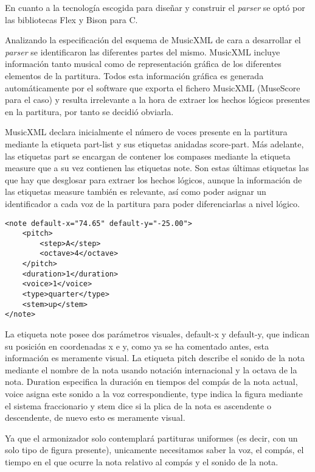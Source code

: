 En cuanto a la tecnología escogida para diseñar y construir el \textit{parser} se optó por las bibliotecas Flex y Bison para C.

Analizando la especificación del esquema de MusicXML de cara a desarrollar el \textit{parser} se identificaron las diferentes partes del mismo. MusicXML incluye información tanto musical como de representación gráfica de los diferentes elementos de la partitura. Todos esta información gráfica es generada automáticamente por el software que exporta el fichero MusicXML (MuseScore para el caso) y resulta irrelevante a la hora de extraer los hechos lógicos presentes en la partitura, por tanto se decidió obviarla. 

MusicXML declara inicialmente el número de voces presente en la partitura mediante la etiqueta part-list y sus etiquetas anidadas score-part. Más adelante, las etiquetas part se encargan de contener los compases mediante la etiqueta measure que a su vez contienen las etiquetas note. Son estas últimas etiquetas las que hay que desglosar para extraer los hechos lógicos, aunque la información de las etiquetas measure también es relevante, así como poder asignar un identificador a cada voz de la partitura para poder diferenciarlas a nivel lógico.

\begin{verbatim}
<note default-x="74.65" default-y="-25.00">
    <pitch>
        <step>A</step>
        <octave>4</octave>
    </pitch>
    <duration>1</duration>
    <voice>1</voice>
    <type>quarter</type>
    <stem>up</stem>
</note>
\end{verbatim}

La etiqueta note posee dos parámetros visuales, default-x y default-y,  que indican su posición en coordenadas x e y, como ya se ha comentado antes, esta información es meramente visual. La etiqueta pitch describe el sonido de la nota mediante el nombre de la nota usando notación internacional y la octava de la nota. Duration especifica la duración en tiempos del compás de la nota actual, voice asigna este sonido a la voz correspondiente, type indica la figura mediante el sistema fraccionario y stem dice si la plica de la nota es ascendente o descendente, de nuevo esto es meramente visual.

Ya que el armonizador solo contemplará partituras uniformes (es decir, con un solo tipo de figura presente), unicamente necesitamos saber la voz, el compás, el tiempo en el que ocurre la nota relativo al compás y el sonido de la nota.

